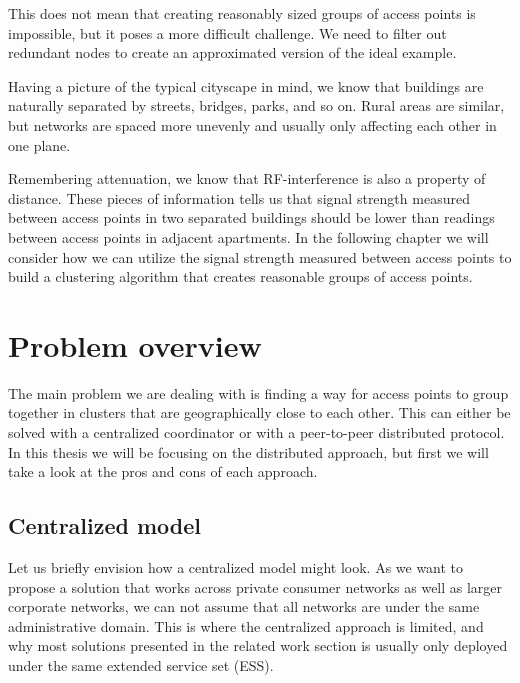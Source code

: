 This does not mean that creating reasonably sized groups of access points is impossible, but it poses a more difficult challenge. 
We need to filter out redundant nodes to create an approximated version of the ideal example.

Having a picture of the typical cityscape in mind, we know that buildings are naturally
separated by streets, bridges, parks, and so on. Rural areas are similar, but networks are spaced more unevenly
and usually only affecting each other in one plane.

Remembering attenuation, we know that RF-interference is also a property of distance. 
These pieces of information tells us that signal strength measured between access points in two separated buildings should be lower than readings between access points in adjacent apartments.
In the following chapter we will consider how we can utilize the signal strength measured between access points to build a clustering algorithm that creates reasonable groups of access points. 


\section{Problem overview}
The main problem we are dealing with is finding a way for access points to group together in clusters that are geographically close to each other. This can either be solved with a centralized
coordinator or with a peer-to-peer distributed protocol. In this thesis we will be focusing on the distributed approach, but first we will take a look at the pros and cons of each approach.

\subsection{Centralized model}
Let us briefly envision how a centralized model might look. As we want to propose a solution that works across private consumer networks as well as larger corporate networks,
we can not assume that all networks are under the same administrative domain. This is where the centralized approach is limited, and why most solutions presented in the related work section is usually only deployed under the same extended service set (ESS).


